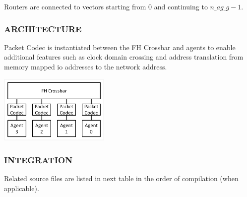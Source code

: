 \documentclass[a4paper,10pt,oneside,final]{article}
\begin{document}
Routers are connected to vectors starting from 0 and continuing to
$n\_ag\_g-1$.



\subsubsection{ARCHITECTURE}

 Packet Codec is instantiated between the FH Crossbar and agents to
 enable additional features such as clock domain crossing and address
 translation from memory mapped io addresses to the network address.

\begin{center}  
  \includegraphics[width=0.4\textwidth]{pic/architecture.png}
\end{center}

\subsubsection{INTEGRATION}

Related  source  files  are listed  in  next  table  in the  order  of
compilation (when applicable).
\end{document}
